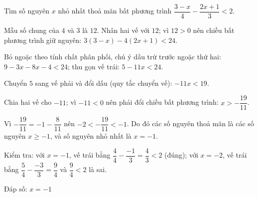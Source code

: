 \begin{problem}[9DS-BPT-044]
Tìm số nguyên $x$ nhỏ nhất thoả mãn bất phương trình $\dfrac{3 - x}{4} - \dfrac{2x + 1}{3} < 2$.

\begin{solution}
Mẫu số chung của $4$ và $3$ là $12$. Nhân hai vế với $12$; vì $12 > 0$ nên chiều bất phương trình giữ nguyên: $3(3 - x) - 4(2x + 1) < 24$.

Bỏ ngoặc theo tính chất phân phối, chú ý dấu trừ trước ngoặc thứ hai: $9 - 3x - 8x - 4 < 24$; thu gọn vế trái: $5 - 11x < 24$.

Chuyển $5$ sang vế phải và đổi dấu (quy tắc chuyển vế): $-11x < 19$.

Chia hai vế cho $-11$; vì $-11 < 0$ nên phải đổi chiều bất phương trình: $x > -\dfrac{19}{11}$.

Vì $-\dfrac{19}{11} = -1 - \dfrac{8}{11}$ nên $-2 < -\dfrac{19}{11} < -1$. Do đó các số nguyên thoả mãn là các số nguyên $x \geq -1$, và số nguyên nhỏ nhất là $x = -1$.

Kiểm tra: với $x = -1$, vế trái bằng $\dfrac{4}{4} - \dfrac{-1}{3} = \dfrac{4}{3} < 2$ (đúng); với $x = -2$, vế trái bằng $\dfrac{5}{4} - \dfrac{-3}{3} = \dfrac{9}{4}$ và $\dfrac{9}{4} < 2$ là sai.

Đáp số: $\boxed{x = -1}$
\end{solution}
\end{problem}

